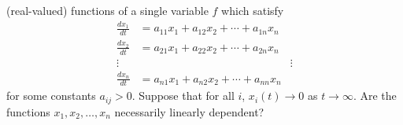 (real-valued) functions of a single variable $f$ which satisfy
\begin{align*}
\frac{dx_{1}}{dt} &= a_{11}x_{1} + a_{12}x_{2} + \cdots +
a_{1n}x_{n} \\
\frac{dx_{2}}{dt} &= a_{21}x_{1} + a_{22}x_{2} + \cdots +
a_{2n}x_{n} \\
\vdots && \vdots \\
\frac{dx_{n}}{dt} &= a_{n1}x_{1} + a_{n2}x_{2} + \cdots +
a_{nn}x_{n}
\end{align*}
for some constants $a_{ij}>0$. Suppose that for all $i$, $x_{i}(t)
\to 0$ as $t \to \infty$. Are the functions $x_{1},x_{2},\dots,x_{n}$
necessarily linearly dependent?
